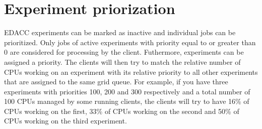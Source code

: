 \documentclass{article}
\begin{document}
\section{Experiment priorization}
EDACC experiments can be marked as inactive and individual jobs can be prioritized. Only jobs of active experiments with priority equal to or greater than 0 are considered for processing
by the client. Futhermore, experiments can be assigned a priority. The clients will then try to match the relative number of CPUs working on an experiment with its relative priority to
all other experiments that are assigned to the same grid queue. For example, if you have three experiments with priorities 100, 200 and 300 respectively and a total number of 100 CPUs managed
by some running clients, the clients will try to have 16\% of CPUs working on the first, 33\% of CPUs working on the second and 50\% of CPUs working on the third experiment.
\end{document}
